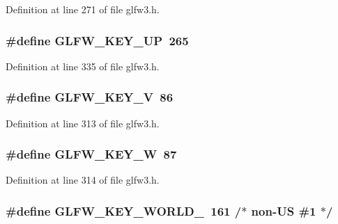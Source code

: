 Definition at line 271 of file glfw3.\-h.

\hypertarget{group__keys_ga2f3342b194020d3544c67e3506b6f144}{
\subsubsection[{G\-L\-F\-W\-\_\-\-K\-E\-Y\-\_\-\-U\-P}]{\setlength{\rightskip}{0pt plus 5cm}\#define G\-L\-F\-W\-\_\-\-K\-E\-Y\-\_\-\-U\-P~265}}\label{group__keys_ga2f3342b194020d3544c67e3506b6f144}


Definition at line 335 of file glfw3.\-h.

\hypertarget{group__keys_ga22c7763899ecf7788862e5f90eacce6b}{
\subsubsection[{G\-L\-F\-W\-\_\-\-K\-E\-Y\-\_\-\-V}]{\setlength{\rightskip}{0pt plus 5cm}\#define G\-L\-F\-W\-\_\-\-K\-E\-Y\-\_\-\-V~86}}\label{group__keys_ga22c7763899ecf7788862e5f90eacce6b}


Definition at line 313 of file glfw3.\-h.

\hypertarget{group__keys_gaa06a712e6202661fc03da5bdb7b6e545}{
\subsubsection[{G\-L\-F\-W\-\_\-\-K\-E\-Y\-\_\-\-W}]{\setlength{\rightskip}{0pt plus 5cm}\#define G\-L\-F\-W\-\_\-\-K\-E\-Y\-\_\-\-W~87}}\label{group__keys_gaa06a712e6202661fc03da5bdb7b6e545}


Definition at line 314 of file glfw3.\-h.

\hypertarget{group__keys_gadc78dad3dab76bcd4b5c20114052577a}{
\subsubsection[{G\-L\-F\-W\-\_\-\-K\-E\-Y\-\_\-\-W\-O\-R\-L\-D\-\_\-1}]{\setlength{\rightskip}{0pt plus 5cm}\#define G\-L\-F\-W\-\_\-\-K\-E\-Y\-\_\-\-W\-O\-R\-L\-D\-\_~161 /$\ast$ non-\/U\-S \#1 $\ast$/}}\label{group__keys_gadc78dad3dab76bcd4b5c20114052577a}



